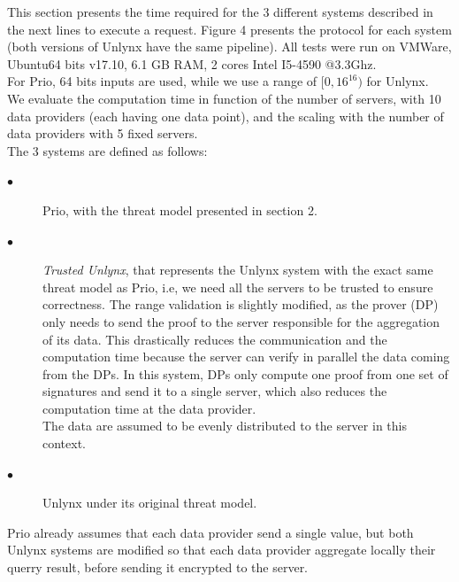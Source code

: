 \documentclass{article}
\begin{document}
This section presents the time required for the 3 different systems described in the next lines to execute a request. Figure 4  presents the protocol for each system (both versions of Unlynx have the same pipeline). All tests were run on VMWare, Ubuntu64 bits v17.10, 6.1 GB RAM, 2 cores Intel I5-4590 @3.3Ghz.\\
For Prio, 64 bits inputs are used, while we use a range of $[0,16^{16})$ for Unlynx.\\
We evaluate the computation time in function of the number of servers, with 10 data providers (each having one data point), and the scaling with the number of data providers with 5 fixed servers.\\
The 3 systems are defined as follows:
\begin{description}
\item[$\bullet$] Prio, with the threat model presented in section 2.
\item[$\bullet$] \textit{Trusted Unlynx}, that represents the Unlynx system with the exact same threat model as Prio, i.e, we need all the servers to be trusted to ensure correctness. The range validation is slightly modified, as the prover (DP) only needs to send the proof to the server responsible for the aggregation of its data. This drastically reduces the communication and the computation time because the server can verify in parallel the data coming from the DPs. In this system, DPs only compute one proof from one set of signatures and send it to a single server, which also reduces the computation time at the data provider.\\
The data are assumed to be evenly distributed to the server in this context.
\item[$\bullet$] Unlynx under its original threat model.
\end{description}

Prio already assumes that each data provider send a single value, but both Unlynx systems are modified so that each data provider aggregate locally their querry result, before sending it encrypted to the server.
\end{document}
